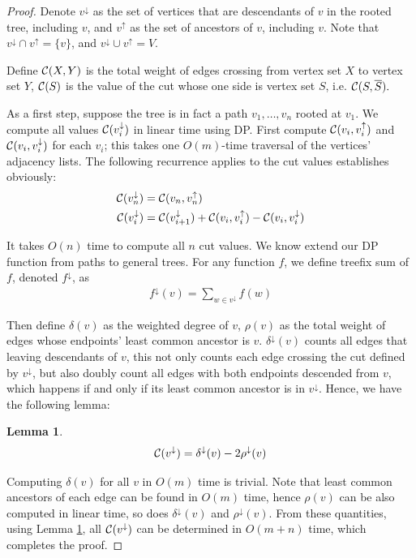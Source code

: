 \documentclass[11pt]{article}
\newcommand{\descendants}[1]{#1^\downarrow}
\newcommand{\ancestors}[1]{{#1}^\uparrow}
\newcommand{\cutval}[1]{{\cal C}(#1)}
\newcommand{\crossweight}[2]{{\cal C}(#1,#2)}
\theoremstyle{plain}
\newtheorem{lemma}{Lemma}[section]
\begin{document}
\begin{proof}
    Denote $\descendants{v}$ as the set of vertices that are descendants of $v$ in the rooted tree, including $v$, and $\ancestors{v}$ as the set of ancestors of $v$, including $v$. Note that $\descendants{v}\cap\ancestors{v}=\{v\}$, and $\descendants{v}\cup\ancestors{v}=V$.

    Define $\crossweight{X}{Y}$ is the total weight of edges crossing from vertex set $X$ to vertex set $Y$, $\cutval{S}$ is the value of the cut whose one side is vertex set $S$, i.e. $\crossweight{S}{\overline{S}}.$

    As a first step, suppose the tree is in fact a path $v_1,\ldots,v_n$ rooted at $v_1$.  We compute all values $\cutval{\descendants{v_i}}$ in linear time using DP. First compute $\crossweight{v_i}{\ancestors{v}_i}$ and $\crossweight{v_i}{\descendants{v}_i}$ for each $v_i$; this takes one $O(m)$-time traversal of the vertices' adjacency lists. The following recurrence applies to the cut values establishes obviously:
    \begin{align*}
    \cutval{\descendants{v_n}} &= \crossweight{v_n}{\ancestors{v}_n}\\ 
    \cutval{\descendants{v_i}} &= \cutval{\descendants{v}_{i+1}}+\crossweight{v_i}{\ancestors{v}_i} -\crossweight{v_i}{\descendants{v}_i}
    \end{align*}

    It takes $O(n)$ time to compute all $n$ cut values. We know extend our DP function from paths to general trees. For any function $f$, we define treefix sum of $f$, denoted $\descendants{f}$, as
    \begin{align*}
        \descendants{f}(v)=\sum_{w\in\descendants{v}}f(w)
    \end{align*}

    Then define $\delta(v)$ as the weighted degree of $v$, $\rho(v)$ as the total weight of edges whose endpoints' least common ancestor is $v$. $\descendants{\delta}(v)$ counts all edges that leaving descendants of $v$, this not only counts each edge crossing the cut defined by $\descendants{v}$, but also doubly count all edges with both endpoints descended from $v$, which happens if and only if its least common ancestor is in $\descendants{v}$. Hence, we have the following lemma:

    \begin{lemma}
        \label{lemma:delta}
        \begin{align*}
            \cutval{\descendants{v}} = \descendants{\delta}(v)-2\descendants{\rho}(v)
        \end{align*}
    \end{lemma}

    Computing $\delta(v)$ for all $v$ in $O(m)$ time is trivial. Note that least common ancestors of each edge can be found in $O(m)$ time\cite{gabow1983linear}, hence $\rho(v)$ can be also computed in linear time, so does $\descendants{\delta}(v)$ and $\descendants{\rho}(v)$. From these quantities, using Lemma \ref{lemma:delta}, all $\cutval{\descendants{v}}$ can be determined in $O(m+n)$ time, which completes the proof.
\end{proof}
\end{document}
